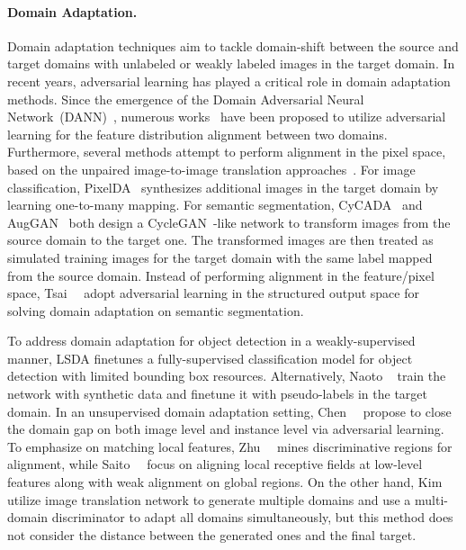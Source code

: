 \documentclass[10pt,twocolumn,letterpaper]{article}
\begin{document}
\vspace{-4mm}\paragraph{Domain Adaptation.}
Domain adaptation techniques aim to tackle domain-shift between the source and target domains with unlabeled or weakly labeled images in the target domain.
In recent years, adversarial learning has played a critical role in domain adaptation methods.
Since the emergence of the Domain Adversarial Neural Network~(DANN)~\cite{ganin2016domain}, numerous works~\cite{Bousmalis2016DomainSN,Tzeng2017AdversarialDD,chen2018domain} have been proposed to utilize adversarial learning for the feature distribution alignment between two domains.
Furthermore, several methods attempt to perform alignment in the pixel space, based on the unpaired image-to-image translation approaches~\cite{CycleGAN2017}.
For image classification, PixelDA~\cite{bousmalis2017unsupervised} synthesizes additional images in the target domain by learning one-to-many mapping. 
For semantic segmentation, CyCADA~\cite{hoffman2017cycada} and AugGAN~\cite{huang2018auggan} both design a CycleGAN~\cite{CycleGAN2017}-like network to transform images from the source domain to the target one.
The transformed images are then treated as simulated training images for the target domain with the same label mapped from the source domain.
Instead of performing alignment in the feature/pixel space, Tsai~\etal~\cite{Tsai_adaptseg_2018, Tsai_DA4Seg_ICCV19} adopt adversarial learning in the structured output space for solving domain adaptation on semantic segmentation.

To address domain adaptation for object detection in a weakly-supervised manner, LSDA \cite{hoffman2014lsda} finetunes a fully-supervised classification model for object detection with limited bounding box resources. 
Alternatively, Naoto \etal~\cite {Inoue_2018_CVPR} train the network with synthetic data and finetune it with pseudo-labels in the target domain.
In an unsupervised domain adaptation setting, Chen~\etal~\cite{chen2018domain} propose to close the domain gap on both image level and instance level via adversarial learning.
To emphasize on matching local features, Zhu~\etal~\cite{Zhu_2019_CVPR} mines discriminative regions for alignment,
while Saito~\etal~\cite{Saito_2019_CVPR} focus on aligning local receptive fields at low-level features along with weak alignment on global regions.
On the other hand, Kim~\etal~\cite{kim2019diversify} utilize image translation network to generate multiple domains and use a multi-domain discriminator to adapt all domains simultaneously, but this method does not consider the distance between the generated ones and the final target.
\end{document}
